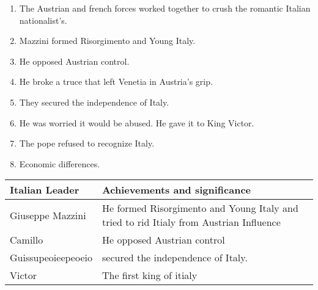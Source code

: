 %
%
%
%
%
%

\begin{enumerate}
  \item The Austrian and french forces worked together to crush the romantic Italian nationalist's.
  \item Mazzini formed Risorgimento and Young Italy.
  \item He opposed Austrian control.
  \item He broke a truce that left Venetia in Austria's grip.
  \item They secured the independence of Italy.
  \item He was worried it would be abused. He gave it to King Victor.
  \item The pope refused to recognize Italy.
  \item Economic differences.
\end{enumerate}

\begin{tabular}{| l  | p{10cm}|}
	\hline
	Italian Leader & Achievements and significance \\ \hline \hline
	Giuseppe Mazzini & He formed Risorgimento and Young Italy and tried to
	rid Itialy from Austrian Influence\\ \hline
	Camillo & He opposed Austrian control \\ \hline
	Guissupeoieepeoeio & secured the independence of Italy. \\ \hline
	Victor & The first king of itialy \\ \hline
\end{tabular}


%

